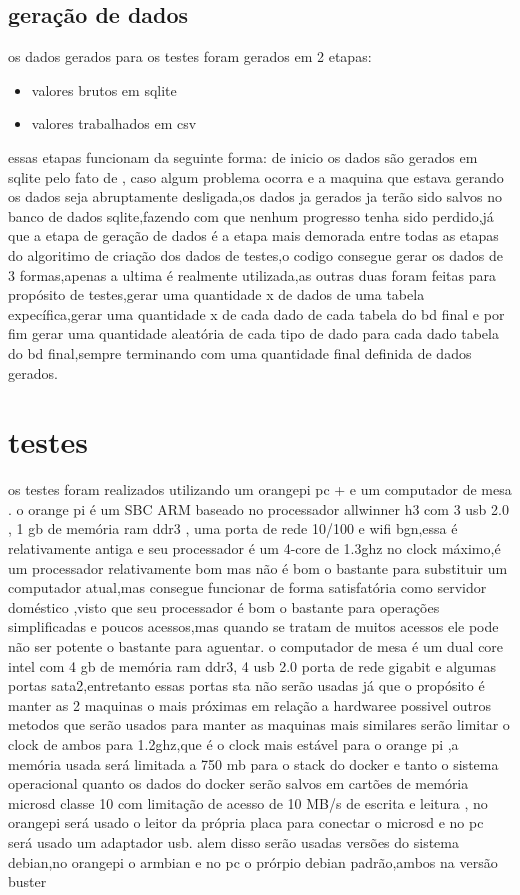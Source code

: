 \documentclass[
	12pt,				%
	openright,			%
	oneside,			%
	a4paper,			%
	english,			%
	french,				%
	spanish,			%
	brazil,				%
	]{abntex2}
\begin{document}
\section{geração de dados}
os dados gerados para os testes foram gerados em 2 etapas:
\begin{itemize}
\item valores brutos em sqlite
\item valores trabalhados em csv
\end{itemize}
essas etapas funcionam da seguinte forma:\newline
de inicio os dados são gerados em sqlite pelo fato de , caso algum problema ocorra e a maquina que estava gerando os dados seja abruptamente desligada,os dados ja gerados ja terão sido salvos no banco de dados sqlite,fazendo com que nenhum progresso tenha sido perdido,já que a etapa de geração de dados é a etapa mais demorada entre todas as etapas do algoritimo de criação dos dados de testes,o codigo consegue gerar os dados de 3 formas,apenas a ultima é realmente utilizada,as outras duas foram feitas para propósito de testes,gerar uma quantidade x de dados de uma tabela expecífica,gerar uma quantidade x de cada dado de cada tabela do bd final e por fim gerar uma quantidade aleatória de cada tipo de dado para cada dado tabela do bd final,sempre terminando com uma quantidade final definida de dados gerados.\newline




\chapter{testes}
\label{ch: testes}
os testes foram realizados utilizando um orangepi pc + e um computador de mesa .
o orange pi é um SBC ARM baseado no processador allwinner h3 com 3 usb 2.0 , 1 gb de memória ram ddr3 , uma porta de rede 10/100 e wifi bgn,essa é relativamente antiga e seu processador é um 4-core de 1.3ghz no clock máximo,é um processador relativamente bom mas não é bom o bastante para substituir um computador atual,mas consegue funcionar de forma satisfatória como servidor doméstico ,visto que seu processador é bom o bastante para operações simplificadas e poucos acessos,mas quando se tratam de muitos acessos ele pode não ser potente o bastante para aguentar.
o computador de mesa é um dual core intel com 4 gb de memória ram ddr3, 4 usb 2.0 porta de rede gigabit e algumas portas sata2,entretanto essas portas sta não serão usadas já que o propósito é manter as 2 maquinas o mais próximas em relação a hardwaree possivel
outros metodos que serão usados para manter as maquinas mais similares serão limitar o clock de ambos para 1.2ghz,que é o clock mais estável para o orange pi ,a memória usada será limitada a 750 mb para o stack do docker e tanto o sistema operacional quanto os dados do docker serão salvos em cartões de memória microsd classe 10 com limitação de acesso de 10 MB/s de escrita e leitura , no orangepi será usado o leitor da própria placa para conectar o microsd e no pc será usado um adaptador usb.
alem disso serão usadas versões do sistema debian,no orangepi o armbian e no pc o prórpio debian padrão,ambos na versão buster
\end{document}
